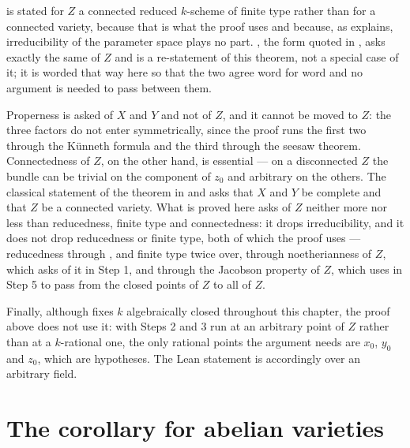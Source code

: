 \begin{remark}
\label{rem:cube-cube-hypotheses}
 is stated for $Z$ a connected reduced $k$-scheme of finite
type rather than for a connected variety, because that is what the proof uses
and because, as  explains, irreducibility of the
parameter space plays no part.  , the form quoted in
, asks exactly the same of $Z$ and is a re-statement of
this theorem, not a special case of it; it is worded that way here so that the
two agree word for word and no argument is needed to pass between them.

Properness is asked of $X$ and $Y$ and not of $Z$, and it cannot be moved to
$Z$: the three factors do not enter symmetrically, since the proof runs the
first two through the K\"unneth formula  and the
third through the seesaw theorem.  Connectedness of $Z$, on the other hand, is
essential --- on a disconnected $Z$ the bundle can be trivial on the component
of $z_0$ and arbitrary on the others.  The classical statement of the theorem
in \cite[\S6]{MumfordAbelianVarieties} and \cite[I, \S5]{MilneAbelianVarieties}
asks that $X$ and $Y$ be complete and that $Z$ be a connected variety.  What is
proved here asks of $Z$ neither more nor less than reducedness, finite type and
connectedness: it drops irreducibility, and it does not drop reducedness or
finite type, both of which the proof uses --- reducedness through
, and finite type twice over, through
noetherianness of $Z$, which  asks of it in
Step 1, and through the Jacobson property of $Z$, which
 uses in Step 5 to pass from the closed points
of $Z$ to all of $Z$.

Finally, although  fixes $k$ algebraically closed
throughout this chapter, the proof above does not use it: with Steps 2 and 3
run at an arbitrary point of $Z$ rather than at a $k$-rational one, the only
rational points the argument needs are $x_0$, $y_0$ and $z_0$, which are
hypotheses.  The Lean statement is accordingly over an arbitrary field.
\end{remark}

\section{The corollary for abelian varieties}\label{sec:cube-abelian}

